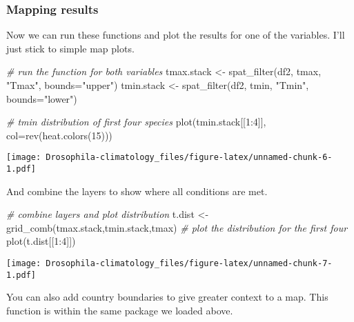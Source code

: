 \documentclass[
]{article}
\newenvironment{Shaded}{\begin{snugshade}}{\end{snugshade}}
\newcommand{\AttributeTok}[1]{\textcolor[rgb]{0.77,0.63,0.00}{#1}}
\newcommand{\CommentTok}[1]{\textcolor[rgb]{0.56,0.35,0.01}{\textit{#1}}}
\newcommand{\DecValTok}[1]{\textcolor[rgb]{0.00,0.00,0.81}{#1}}
\newcommand{\FunctionTok}[1]{\textcolor[rgb]{0.00,0.00,0.00}{#1}}
\newcommand{\NormalTok}[1]{#1}
\newcommand{\OtherTok}[1]{\textcolor[rgb]{0.56,0.35,0.01}{#1}}
\newcommand{\SpecialCharTok}[1]{\textcolor[rgb]{0.00,0.00,0.00}{#1}}
\newcommand{\StringTok}[1]{\textcolor[rgb]{0.31,0.60,0.02}{#1}}
\begin{document}
\hypertarget{mapping-results}{%
\subsubsection{Mapping results}\label{mapping-results}}

Now we can run these functions and plot the results for one of the
variables. I'll just stick to simple map plots.

\begin{Shaded}
\begin{Highlighting}[]
\CommentTok{\# run the function for both variables}
\NormalTok{tmax.stack }\OtherTok{\textless{}{-}}  \FunctionTok{spat\_filter}\NormalTok{(df2, tmax, }\StringTok{"Tmax"}\NormalTok{, }\AttributeTok{bounds=}\StringTok{"upper"}\NormalTok{)}
\NormalTok{tmin.stack }\OtherTok{\textless{}{-}}  \FunctionTok{spat\_filter}\NormalTok{(df2, tmin, }\StringTok{"Tmin"}\NormalTok{, }\AttributeTok{bounds=}\StringTok{"lower"}\NormalTok{)}

\CommentTok{\# tmin distribution of first four species}
\FunctionTok{plot}\NormalTok{(tmin.stack[[}\DecValTok{1}\SpecialCharTok{:}\DecValTok{4}\NormalTok{]], }\AttributeTok{col=}\FunctionTok{rev}\NormalTok{(}\FunctionTok{heat.colors}\NormalTok{(}\DecValTok{15}\NormalTok{)))}
\end{Highlighting}
\end{Shaded}

\texttt{[image: Drosophila-climatology\_files/figure-latex/unnamed-chunk-6-1.pdf]}

And combine the layers to show where all conditions are met.

\begin{Shaded}
\begin{Highlighting}[]
\CommentTok{\# combine layers and plot distribution}
\NormalTok{t.dist }\OtherTok{\textless{}{-}} \FunctionTok{grid\_comb}\NormalTok{(tmax.stack,tmin.stack,tmax)}
\CommentTok{\# plot the distribution for the first four}
\FunctionTok{plot}\NormalTok{(t.dist[[}\DecValTok{1}\SpecialCharTok{:}\DecValTok{4}\NormalTok{]])}
\end{Highlighting}
\end{Shaded}

\texttt{[image: Drosophila-climatology\_files/figure-latex/unnamed-chunk-7-1.pdf]}

You can also add country boundaries to give greater context to a map.
This function is within the same package we loaded above.
\end{document}
